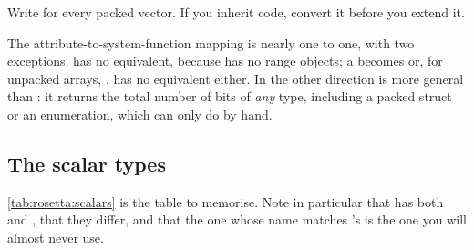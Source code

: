 \begin{ruleofthumb}
Write \code{[N-1:0]} for every packed vector. If you inherit \code{[0:N-1]}
code, convert it before you extend it.
\end{ruleofthumb}

The attribute-to-system-function mapping is nearly one to one, with two
exceptions.  has no \SV{} equivalent, because \SV{} has no range
objects; a \VHDL{}  becomes
 or, for unpacked arrays,
.  has no equivalent either. In the
other direction  is more general than : it returns
the total number of bits of \emph{any} type, including a packed struct or an
enumeration, which \VHDL{} can only do by hand.

\subsection{The scalar types}

\cref{tab:rosetta:scalars} is the table to memorise. Note in particular that
\SV{} has both  and , that they differ, and that the one
whose name matches \VHDL{}'s is the one you will almost never use.

